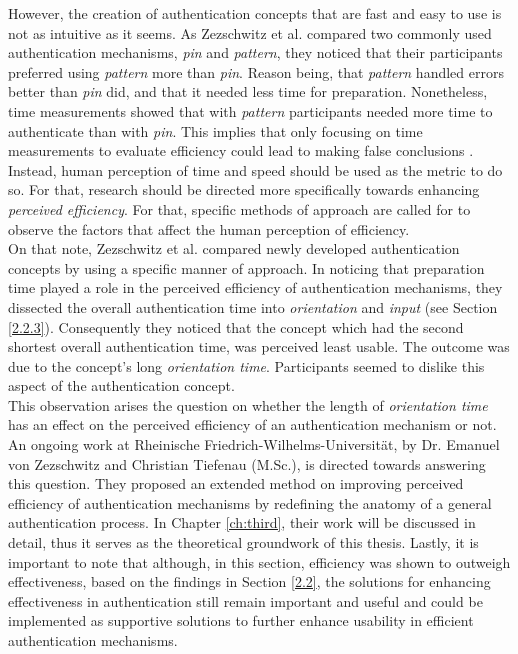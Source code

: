 However, the creation of authentication concepts that are fast and easy to use is not as intuitive as it seems. As Zezschwitz et al. \cite{PatternWild} compared two commonly used authentication mechanisms, \textit{pin} and \textit{pattern}, they noticed that their participants preferred using \textit{pattern} more than \textit{pin}. Reason being, that \textit{pattern} handled errors better than \textit{pin} did, and that it needed less time for preparation. Nonetheless, time measurements showed that with \textit{pattern} participants needed more time to authenticate than with \textit{pin}. This implies that only focusing on time measurements to evaluate efficiency could lead to making false conclusions \cite{Zezschwitz}. Instead, human perception of time and speed should be used as the metric to do so. For that, research should be directed more specifically towards enhancing \textit{perceived efficiency}. For that, specific methods of approach are called for to observe the factors that affect the human perception of efficiency. \\

On that note, Zezschwitz et al. \cite{Marbles} compared newly developed authentication concepts by using a specific manner of approach. In noticing that preparation time played a role in the perceived efficiency of authentication mechanisms, they dissected the overall authentication time into \textit{orientation} and \textit{input} (see Section \ref{2.2.3}). Consequently they noticed that the concept which had the second shortest overall authentication time, was perceived least usable. The outcome was due to the concept's long \textit{orientation time}. Participants seemed to dislike this aspect of the authentication concept.\\
This observation arises the question on whether the length of \textit{orientation time} has an effect on the perceived efficiency of an authentication mechanism or not. An ongoing work at Rheinische Friedrich-Wilhelms-Universit{\"a}t, by Dr. Emanuel von Zezschwitz and Christian Tiefenau (M.Sc.), is directed towards answering this question. They proposed an extended method on improving perceived efficiency of authentication mechanisms by redefining the anatomy of a general authentication process. In Chapter \ref{ch:third}, their work will be discussed in detail, thus it serves as the theoretical groundwork of this thesis. Lastly, it is important to note that although, in this section, efficiency was shown to outweigh effectiveness, based on the findings in Section \ref{2.2}, the solutions for enhancing effectiveness in authentication still remain important and useful and could be implemented as supportive solutions to further enhance usability in efficient authentication mechanisms.




